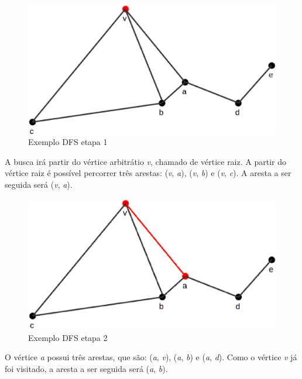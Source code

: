 \begin{figure}[!h]
	\centering
	\includegraphics[scale=0.4]{figuras/capitulo1/dfs/dfs1.eps}
	\caption{Exemplo DFS etapa 1}
	\label{dfs1}
\end{figure}

A busca irá partir do vértice arbitrátio \textit{v}, chamado de vértice raiz. A partir do vértice raiz é possível percorrer três arestas: (\textit{v}, \textit{a}), (\textit{v}, \textit{b}) e (\textit{v}, \textit{c}). A aresta a ser seguida será (\textit{v}, \textit{a}).

\begin{figure}[!h]
	\centering
	\includegraphics[scale=0.4]{figuras/capitulo1/dfs/dfs2.eps}
	\caption{Exemplo DFS etapa 2}
	\label{dfs2}
\end{figure}

O vértice \textit{a} possui três arestas, que são: (\textit{a}, \textit{v}), (\textit{a}, \textit{b}) e (\textit{a}, \textit{d}). Como o vértice \textit{v} já foi visitado, a aresta a ser seguida será (\textit{a}, \textit{b}).

